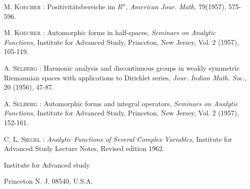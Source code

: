 \begin{thebibliography}{99}
 \textsc{M. Koecher :} Positivit\"atsbereiche im $R^{n}$, {\em American Jour. Math.} 79(1957), 575-596.

 \textsc{M. Koecher :} Automorphic forms in half-spaces, {\em Seminars on Analytic Functions,} Institute for Advanced Study, Princeton, New Jersey, Vol. 2 (1957), 105-119.

 \textsc{A. Selberg :} Harmonic analysis and discontinuous groups in weakly symmetric Riemannian spaces with applications to Dirichlet series, {\em Jour. Indian Math. Soc.,} 20 (1956), 47-87.

 \textsc{A. Selberg :} Automorphic forms and integral operators, {\em Seminars on Analytic Functions,} Institute for Advanced Study, Princeton, New Jersey, Vol. 2 (1957), 152-161.

 \textsc{C. L. Siegel :} {\em Analytic Functions of Several Complex Variables,} Institute for Advanced Study Lecture Notes, Revised edition 1962.
\end{thebibliography}

\bigskip
\noindent
{\small Institute for Advanced study}

\noindent
{\small Princeton N. J. 08540, U.S.A.}
